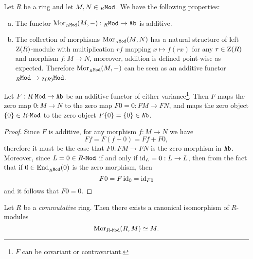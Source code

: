 \begin{lemma}
\label{lem:hom-functor-is-additive}
Let \(R\) be a ring and let \(M, N \in {{}_{R}\texttt{Mod}}\). We have the following
properties:
\begin{enumerate}[(a)]\setlength\itemsep{0em}
\item The functor \(\operatorname{Mor}_{{{}_{R}\texttt{Mod}}}(M, -): {{}_{R}\texttt{Mod}} \to {\texttt{Ab}}\) is additive.

\item The collection of morphisms \(\operatorname{Mor}_{{{}_{R}\texttt{Mod}}}(M, N)\) has a natural
  structure of left \(\operatorname{Z}(R)\)-module with multiplication \(r f\) mapping
  \(x \mapsto f(r x)\) for any \(r \in \operatorname{Z}(R)\) and morphism \(f: M \to N\), moreover,
  addition is defined point-wise as expected. Therefore
  \(\operatorname{Mor}_{{{}_{R}\texttt{Mod}}}(M, -)\) can be seen as an additive functor
  \({{}_{R}\texttt{Mod}} \to {{}_{\operatorname{Z}(R)}\texttt{Mod}}\).
\end{enumerate}
\end{lemma}

\begin{proposition}
\label{prop:additive-functor-zero-maps-zero-obj}
Let \(F: {R\text{-}\texttt{Mod}} \to {\texttt{Ab}}\) be an additive functor of either
variance\footnote{\(F\) can be covariant or contravariant.}. Then
\(F\) maps the
zero map \(0: M \to N\) to the zero map \(F 0 = 0: F M \to F N\), and maps the zero
object \(\{0\} \in {R\text{-}\texttt{Mod}}\) to the zero object \(F \{0\} = \{0\} \in {\texttt{Ab}}\).
\end{proposition}

\begin{proof}
Since \(F\) is additive, for any morphism \(f: M \to N\) we have
\[
F f = F (f + 0) = F f + F 0,
\]
therefore it must be the case that \(F 0: F M \to F N\) is the zero morphism in
\({\texttt{Ab}}\). Moreover, since \(L = 0 \in {R\text{-}\texttt{Mod}}\) if and only if \(\operatorname{id}_L = 0: L \to
L\), then from the fact that if \(0 \in \operatorname{End}_{{{}_{R}\texttt{Mod}}}(0)\) is the zero morphism,
then
\[
F 0 = F \operatorname{id}_0 = \operatorname{id}_{F 0}
\]
and it follows that \(F 0 = 0\).
\end{proof}

\begin{proposition}
\label{prop:Mor(R,M)-iso-M-for-commutative-R}
Let \(R\) be a \emph{commutative} ring. Then there exists a canonical
isomorphism of \(R\)-modules
\[
\operatorname{Mor}_{{R\text{-}\texttt{Mod}}}(R, M) \simeq M.
\]
\end{proposition}

